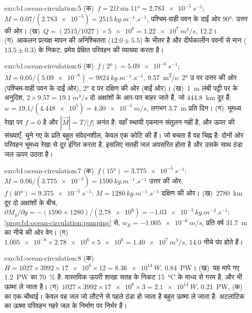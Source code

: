 \begin{solution}{exo:b1:ocean-circulation:5}
(क)~$f = 2\Omega\sin\ang{11} = \qty{2.783e-5}{s^{-1}}$; $M = 0.07/(\num{2.783e-5}) =
\qty{2515}{kg.m^{-1}.s^{-1}}$, पश्चिम-वाही पवन के दाईं ओर \ang{90}: उत्तर की ओर। (ख)~$Q = (2515/1027) \times \num{5e6} = \qty{1.22e7}{m^3/s}$,
\qty{12.2}{\sverdrup}। (ग)~आकलन प्रत्यक्ष मापन की अनिश्चितता ($12.0 \pm 5.5$) के भीतर है और दीर्घकालीन पवनों से मान ($13.5 \pm 0.3$) के निकट: प्रमेय प्रेक्षित परिवहन की व्याख्या करता है।
\end{solution}

\begin{solution}{exo:b1:ocean-circulation:6}
(क)~$f(\ang{2}) = \qty{5.09e-6}{s^{-1}}$; $M = 0.05/(\num{5.09e-6}) =
\qty{9824}{kg.m^{-1}.s^{-1}}$, \qty{9.57}{m^2/s}: \ang{2} उ पर उत्तर की ओर (पश्चिम-वाही पवन के दाईं ओर), \ang{2} द पर दक्षिण की ओर (बाईं ओर)। (ख)~\qty{1}{m} लंबी पट्टी पर  के अनुदिश, $2 \times 9.57 = \qty{19.1}{m^3/s}$ दो अक्षांशों के आर-पार बाहर जाते हैं, जो \qty{444.8}{km} दूर हैं: $w = 19.1/(\num{4.448e5}) = \qty{4.30e-5}{m/s}$, लगभग \qty{3.7}{m} प्रति दिन। (ग)~भूमध्य रेखा पर $f = 0$ है और $|\vec M| = T/|f|$ अनंत है: वहाँ स्थायी एकमान संतुलन नहीं है, और ऊपर की संख्याएँ, चुने गए  के प्रति बहुत संवेदनशील, केवल एक कोटि की हैं। जो बचता है वह चिह्न है: दोनों ओर परिवहन भूमध्य रेखा से दूर इंगित करता है, इसलिए सतही जल अपसरित होता है और उसके साथ ठंडा जल ऊपर उठता है।
\end{solution}

\begin{solution}{exo:b1:ocean-circulation:7}
(क)~$f(\ang{15}) = \qty{3.775e-5}{s^{-1}}$: $M = 0.06/(\num{3.775e-5}) =
\qty{1590}{kg.m^{-1}.s^{-1}}$ उत्तर की ओर; $f(\ang{40}) =
\qty{9.375e-5}{s^{-1}}$: $M = \qty{1280}{kg.m^{-1}.s^{-1}}$ दक्षिण की ओर।
(ख)~\qty{2780}{km} दूर दो अक्षांशों के बीच, $\partial M_y/\partial y =
-(1590 + 1280)/(\num{2.78e6}) = \qty{-1.03e-3}{kg.m^{-2}.s^{-1}}$: \cref{prop:b1:ocean-circulation:pumping} से, $w_E = \qty{-1.005e-6}{m/s}$, प्रति वर्ष \qty{31.7}{m} का नीचे की ओर वेग। (ग)~$\num{1.005e-6} \times \num{2.78e6} \times
\num{5e6} = \qty{1.40e7}{m^3/s}$, \qty{14.0}{\sverdrup} नीचे पंप होते हैं।
\end{solution}

\begin{solution}{exo:b1:ocean-circulation:8}
(क)~$H = 1027 \times 3992 \times \num{17e6} \times 12 = \qty{8.36e14}{W}$,
\qty{0.84}{PW}। (ख)~यह मापे गए \qty{1.2}{PW} का \qty{70}{\percent} है: वास्तविक ऊपरी शाखा सतह के निकट \qty{15}{\celsius} के माध्य से गरम है, और  भी ऊष्मा ले जाता है। (ग)~$1027 \times 3992 \times \num{17e6} \times 3 =
\qty{2.1e14}{W}$, \qty{0.21}{PW}, (क) का एक-चौथाई। केवल वह जल जो लौटने से पहले ठंडा हो जाता है बहुत ऊष्मा ले जाता है: अटलांटिक का ऊष्मा परिवहन गहरे जल के निर्माण पर निर्भर है।
\end{solution}

